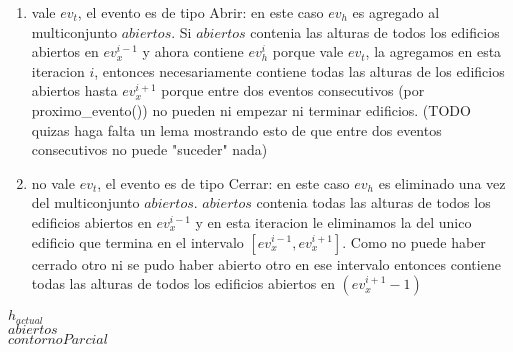 \begin{enumerate}
	\item vale $ev_t$, el evento es de tipo Abrir: en este caso $ev_h$ es agregado al multiconjunto $abiertos$. 
	Si $abiertos$ contenia las alturas de todos los edificios abiertos en $ev^{i-1}_x$ y ahora contiene $ev^{i}_h$
	porque vale $ev_t$, la agregamos en esta iteracion $i$, entonces necesariamente contiene todas las alturas
	de los edificios abiertos hasta $ev^{i+1}_x$ porque entre dos eventos consecutivos (por proximo\_evento()) no 
	pueden ni empezar ni terminar edificios. (TODO quizas haga falta un lema mostrando esto de que entre dos eventos
	consecutivos no puede "suceder" nada)
	
	\item no vale $ev_t$, el evento es de tipo Cerrar: en este caso $ev_h$ es eliminado una vez del multiconjunto
	$abiertos$. $abiertos$ contenia todas las alturas de todos los edificios abiertos en $ev^{i-1}_x$ y en esta
	iteracion le eliminamos la del unico edificio que termina en el intervalo $[ev^{i-1}_x,ev^{i+1}_x]$. Como
	no puede haber cerrado otro ni se pudo haber abierto otro en ese intervalo entonces contiene todas las 
	alturas de todos los edificios abiertos en $(ev^{i+1}_x-1)$ 
\end{enumerate}











\begin{description}
	\item[$h_{actual}$] 
	
	\item[$abiertos$] 
	
	\item[$contornoParcial$] 
\end{description}





